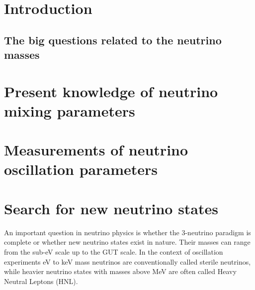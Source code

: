 \documentclass[../report.tex]{subfiles}
\providecommand{\main}{..}
\begin{document}
\linenumbers
\section{Introduction}




\subsection{The big questions related to the neutrino masses }



\section{Present knowledge of neutrino mixing parameters}



\section{Measurements of neutrino oscillation parameters}



\section{Search for new neutrino states}

An important question in neutrino physics is whether the 3-neutrino paradigm is complete or whether new neutrino states exist in nature. Their masses can range from the sub-eV scale up to the GUT scale. In the context of oscillation experiments eV to keV mass neutrinos are conventionally called sterile neutrinos, while heavier neutrino states with masses above MeV are often called Heavy Neutral Leptons (HNL).
\end{document}
